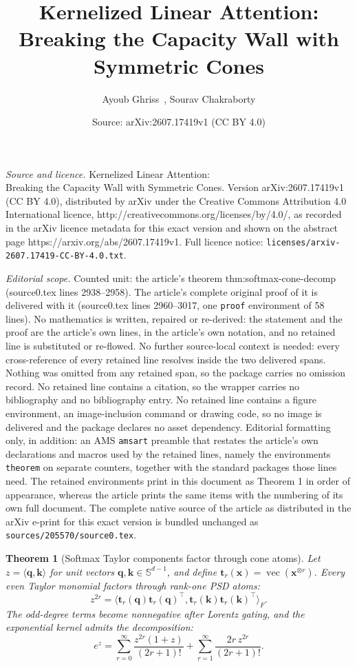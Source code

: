 \documentclass[10pt,a4paper]{amsart}
\title{Kernelized Linear Attention:\\Breaking the Capacity Wall with Symmetric Cones}
\author{Ayoub Ghriss\, , Sourav Chakraborty}
\date{Source: arXiv:2607.17419v1 (CC BY 4.0)}
\newtheorem{theorem}{Theorem}
\newcommand{\lrangle}[1]{\langle#1\rangle}
\def\vk{{\bm{k}}}
\def\vq{{\bm{q}}}
\def\vt{{\bm{t}}}
\def\vx{{\bm{x}}}
\begin{document}
\maketitle

\noindent\emph{Source and licence.} Kernelized Linear Attention:\\Breaking the Capacity Wall with Symmetric Cones. Version arXiv:2607.17419v1 (CC BY 4.0), distributed by arXiv under the Creative Commons Attribution 4.0 International licence, http://creativecommons.org/licenses/by/4.0/, as recorded in the arXiv licence metadata for this exact version and shown on the abstract page https://arxiv.org/abs/2607.17419v1. Full licence notice: \texttt{licenses/arxiv-2607.17419-CC-BY-4.0.txt}.\par\smallskip

\noindent\textit{Editorial scope.} Counted unit: the article's theorem thm:softmax-cone-decomp (source0.tex lines 2938--2958). The article's complete original proof of it is delivered with it (source0.tex lines 2960--3017, one \texttt{proof} environment of 58 lines). No mathematics is written, repaired or re-derived: the statement and the proof are the article's own lines, in the article's own notation, and no retained line is substituted or re-flowed.  No further source-local context is needed: every cross-reference of every retained line resolves inside the two delivered spans.  Nothing was omitted from any retained span, so the package carries no omission record.  No retained line contains a citation, so the wrapper carries no bibliography and no bibliography entry.  No retained line contains a figure environment, an image-inclusion command or drawing code, so no image is delivered and the package declares no asset dependency.  Editorial formatting only, in addition: an AMS \texttt{amsart} preamble that restates the article's own declarations and macros used by the retained lines, namely the environments \texttt{theorem} on separate counters, together with the standard packages those lines need.  The retained environments print in this document as Theorem 1 in order of appearance, whereas the article prints the same items with the numbering of its own full document.  The complete native source of the article as distributed in the arXiv e-print for this exact version is bundled unchanged as \texttt{sources/205570/source0.tex}.
\begin{theorem}[Softmax Taylor components factor through cone atoms]
  \label{thm:softmax-cone-decomp}
  Let $z=\lrangle{\vq,\vk}$ for unit vectors $\vq,\vk\in\mathbb{S}^{d-1}$, and define
  $\vt_r(\vx)=\operatorname{vec}(\vx^{\otimes r})$. Every even Taylor monomial factors through
  rank-one PSD atoms:
  \[
    z^{2r}
    =
    \lrangle{\vt_r(\vq)\vt_r(\vq)^\top,
      \vt_r(\vk)\vt_r(\vk)^\top}_F.
  \]
  The odd-degree terms become nonnegative after Lorentz gating, and the exponential kernel admits
  the decomposition:
  \[
    e^z
    =
    \sum_{r=0}^{\infty}\frac{z^{2r}(1+z)}{(2r+1)!}
    +
    \sum_{r=1}^{\infty}\frac{2r\,z^{2r}}{(2r+1)!}.
  \]
\end{theorem}
\end{document}
